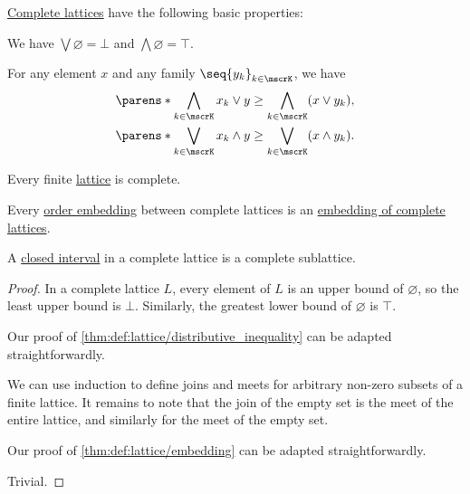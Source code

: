 \begin{proposition}\label{thm:def:complete_lattice}
  \hyperref[def:complete_lattice]{Complete lattices} have the following basic properties:
  \begin{thmenum}
     We have \( \bigvee \varnothing = \bot \) and \( \bigwedge \varnothing = \top \).

     For any element \( x \) and any family \( \seq{ y_k }_{k \in \mscrK} \), we have
    \begin{align}
      \parens*{ \bigwedge_{k \in \mscrK} x_k } \vee y &\geq \bigwedge_{k \in \mscrK} (x \vee y_k), \label{eq:thm:def:complete_lattice/distributive_inequality/join_over_meet} \\
      \parens*{ \bigvee_{k \in \mscrK} x_k } \wedge y &\geq \bigvee_{k \in \mscrK} (x \wedge y_k). \label{eq:thm:def:complete_lattice/distributive_inequality/meet_over_join}
    \end{align}

     Every finite \hyperref[def:lattice]{lattice} is complete.

     Every \hyperref[def:partially_ordered_set/morphism]{order embedding} between complete lattices is an \hyperref[def:lattice/morphism]{embedding of complete lattices}.

     A \hyperref[def:order_interval/closed]{closed interval} in a complete lattice is a complete sublattice.
  \end{thmenum}
\end{proposition}
\begin{proof}
   In a complete lattice \( L \), every element of \( L \) is an upper bound of \( \varnothing \), so the least upper bound is \( \bot \). Similarly, the greatest lower bound of \( \varnothing \) is \( \top \).

   Our proof of \cref{thm:def:lattice/distributive_inequality} can be adapted straightforwardly.

   We can use induction to define joins and meets for arbitrary non-zero subsets of a finite lattice. It remains to note that the join of the empty set is the meet of the entire lattice, and similarly for the meet of the empty set.

   Our proof of \cref{thm:def:lattice/embedding} can be adapted straightforwardly.

   Trivial.
\end{proof}

